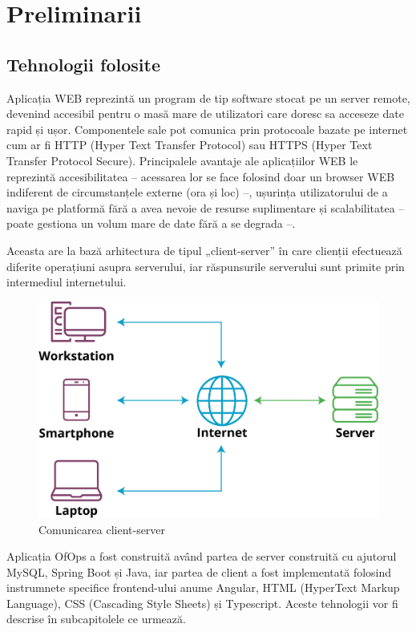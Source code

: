 \chapter{Preliminarii}

\section{Tehnologii folosite}
\hspace{1cm} Aplicația WEB reprezintă un program de tip software stocat pe un server remote, devenind accesibil pentru o masă mare de utilizatori care doresc sa acceseze date rapid și ușor. Componentele sale pot  comunica prin protocoale bazate pe internet cum ar fi HTTP (Hyper Text Transfer Protocol) sau HTTPS (Hyper Text Transfer Protocol Secure).\cite{citation1}  Principalele avantaje ale aplicațiilor WEB le reprezintă accesibilitatea – acessarea lor se face folosind doar un browser WEB indiferent de circumstanțele externe (ora și loc) –, ușurința utilizatorului de a naviga pe platformă fără a avea nevoie de resurse suplimentare și scalabilitatea – poate gestiona un volum mare de date fără a se degrada –.

Aceasta are la bază arhitectura de tipul „client-server” în care clienții efectuează diferite operațiuni asupra serverului, iar răspunsurile serverului sunt primite prin intermediul internetului. 

\begin{figure}[!htb]
    \centering
    \includegraphics[width=0.7\linewidth]{images/client-server-network.png}
    \caption{Comunicarea client-server}
    \label{fig:client-server}
\end{figure}

Aplicația OfOps a fost construită având partea de server construită cu ajutorul MySQL, Spring Boot și Java, iar partea de client a fost implementată folosind instrumnete specifice frontend-ului anume Angular, HTML (HyperText Markup Language), CSS (Cascading Style Sheets) și Typescript. Aceste tehnologii vor fi descrise în subcapitolele ce urmează. 

